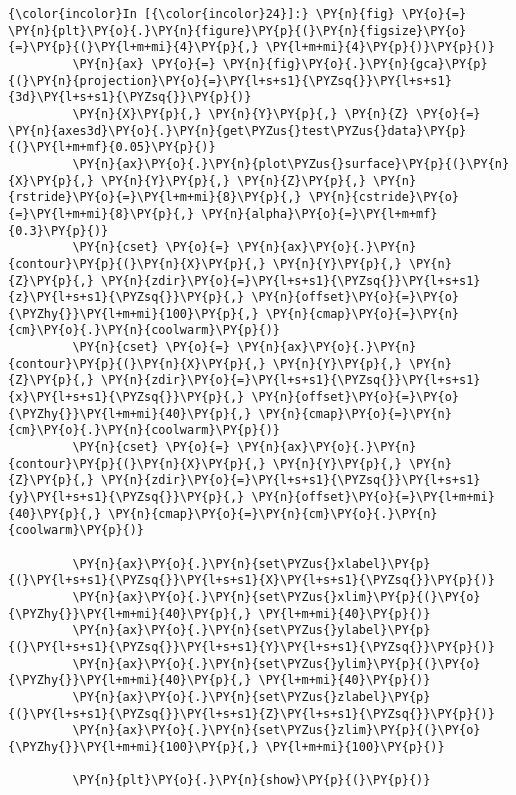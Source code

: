     \begin{Verbatim}[commandchars=\\\{\},frame=single,framerule=0.3mm,rulecolor=\color{cellframecolor}]
{\color{incolor}In [{\color{incolor}24}]:} \PY{n}{fig} \PY{o}{=} \PY{n}{plt}\PY{o}{.}\PY{n}{figure}\PY{p}{(}\PY{n}{figsize}\PY{o}{=}\PY{p}{(}\PY{l+m+mi}{4}\PY{p}{,} \PY{l+m+mi}{4}\PY{p}{)}\PY{p}{)}
         \PY{n}{ax} \PY{o}{=} \PY{n}{fig}\PY{o}{.}\PY{n}{gca}\PY{p}{(}\PY{n}{projection}\PY{o}{=}\PY{l+s+s1}{\PYZsq{}}\PY{l+s+s1}{3d}\PY{l+s+s1}{\PYZsq{}}\PY{p}{)}
         \PY{n}{X}\PY{p}{,} \PY{n}{Y}\PY{p}{,} \PY{n}{Z} \PY{o}{=} \PY{n}{axes3d}\PY{o}{.}\PY{n}{get\PYZus{}test\PYZus{}data}\PY{p}{(}\PY{l+m+mf}{0.05}\PY{p}{)}
         \PY{n}{ax}\PY{o}{.}\PY{n}{plot\PYZus{}surface}\PY{p}{(}\PY{n}{X}\PY{p}{,} \PY{n}{Y}\PY{p}{,} \PY{n}{Z}\PY{p}{,} \PY{n}{rstride}\PY{o}{=}\PY{l+m+mi}{8}\PY{p}{,} \PY{n}{cstride}\PY{o}{=}\PY{l+m+mi}{8}\PY{p}{,} \PY{n}{alpha}\PY{o}{=}\PY{l+m+mf}{0.3}\PY{p}{)}
         \PY{n}{cset} \PY{o}{=} \PY{n}{ax}\PY{o}{.}\PY{n}{contour}\PY{p}{(}\PY{n}{X}\PY{p}{,} \PY{n}{Y}\PY{p}{,} \PY{n}{Z}\PY{p}{,} \PY{n}{zdir}\PY{o}{=}\PY{l+s+s1}{\PYZsq{}}\PY{l+s+s1}{z}\PY{l+s+s1}{\PYZsq{}}\PY{p}{,} \PY{n}{offset}\PY{o}{=}\PY{o}{\PYZhy{}}\PY{l+m+mi}{100}\PY{p}{,} \PY{n}{cmap}\PY{o}{=}\PY{n}{cm}\PY{o}{.}\PY{n}{coolwarm}\PY{p}{)}
         \PY{n}{cset} \PY{o}{=} \PY{n}{ax}\PY{o}{.}\PY{n}{contour}\PY{p}{(}\PY{n}{X}\PY{p}{,} \PY{n}{Y}\PY{p}{,} \PY{n}{Z}\PY{p}{,} \PY{n}{zdir}\PY{o}{=}\PY{l+s+s1}{\PYZsq{}}\PY{l+s+s1}{x}\PY{l+s+s1}{\PYZsq{}}\PY{p}{,} \PY{n}{offset}\PY{o}{=}\PY{o}{\PYZhy{}}\PY{l+m+mi}{40}\PY{p}{,} \PY{n}{cmap}\PY{o}{=}\PY{n}{cm}\PY{o}{.}\PY{n}{coolwarm}\PY{p}{)}
         \PY{n}{cset} \PY{o}{=} \PY{n}{ax}\PY{o}{.}\PY{n}{contour}\PY{p}{(}\PY{n}{X}\PY{p}{,} \PY{n}{Y}\PY{p}{,} \PY{n}{Z}\PY{p}{,} \PY{n}{zdir}\PY{o}{=}\PY{l+s+s1}{\PYZsq{}}\PY{l+s+s1}{y}\PY{l+s+s1}{\PYZsq{}}\PY{p}{,} \PY{n}{offset}\PY{o}{=}\PY{l+m+mi}{40}\PY{p}{,} \PY{n}{cmap}\PY{o}{=}\PY{n}{cm}\PY{o}{.}\PY{n}{coolwarm}\PY{p}{)}
         
         \PY{n}{ax}\PY{o}{.}\PY{n}{set\PYZus{}xlabel}\PY{p}{(}\PY{l+s+s1}{\PYZsq{}}\PY{l+s+s1}{X}\PY{l+s+s1}{\PYZsq{}}\PY{p}{)}
         \PY{n}{ax}\PY{o}{.}\PY{n}{set\PYZus{}xlim}\PY{p}{(}\PY{o}{\PYZhy{}}\PY{l+m+mi}{40}\PY{p}{,} \PY{l+m+mi}{40}\PY{p}{)}
         \PY{n}{ax}\PY{o}{.}\PY{n}{set\PYZus{}ylabel}\PY{p}{(}\PY{l+s+s1}{\PYZsq{}}\PY{l+s+s1}{Y}\PY{l+s+s1}{\PYZsq{}}\PY{p}{)}
         \PY{n}{ax}\PY{o}{.}\PY{n}{set\PYZus{}ylim}\PY{p}{(}\PY{o}{\PYZhy{}}\PY{l+m+mi}{40}\PY{p}{,} \PY{l+m+mi}{40}\PY{p}{)}
         \PY{n}{ax}\PY{o}{.}\PY{n}{set\PYZus{}zlabel}\PY{p}{(}\PY{l+s+s1}{\PYZsq{}}\PY{l+s+s1}{Z}\PY{l+s+s1}{\PYZsq{}}\PY{p}{)}
         \PY{n}{ax}\PY{o}{.}\PY{n}{set\PYZus{}zlim}\PY{p}{(}\PY{o}{\PYZhy{}}\PY{l+m+mi}{100}\PY{p}{,} \PY{l+m+mi}{100}\PY{p}{)}
         
         \PY{n}{plt}\PY{o}{.}\PY{n}{show}\PY{p}{(}\PY{p}{)}
\end{Verbatim}


